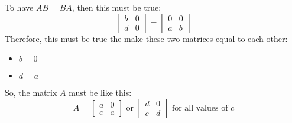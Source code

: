 \documentclass[10pt]{article}
\begin{document}
\noindent To have $AB=BA$, then this must be true:
\begin{equation*}
    \begin{bmatrix}
        b & 0 \\
        d & 0
    \end{bmatrix}
    =
    \begin{bmatrix}
        0 & 0 \\
        a & b
    \end{bmatrix}
\end{equation*}
\noindent Therefore, this must be true the make these two matrices equal to each other:
\begin{itemize}
    \item $b=0$
    \item $d=a$
\end{itemize}
\noindent So, the matrix $A$ must be like this:
\begin{equation*}
    A = 
    \begin{bmatrix}
        a & 0 \\
        c & a
    \end{bmatrix}
    \text{ or }
    \begin{bmatrix}
        d & 0 \\
        c & d
    \end{bmatrix}
    \text{   for all values of $c$}
\end{equation*}
\end{document}
